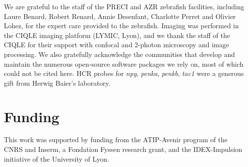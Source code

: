 \documentclass[9.5pt,lineno]{RandlettLab_elife}
\begin{document}
We are grateful to the staff of the PRECI and AZR zebrafish facilities, including Laure Benard, Robert Renard, Annie Desenfant, Charlotte Perret and Olivier Lohez, for the expert care provided to the zebrafish. 
Imaging was performed in the CIQLE imaging platform (LYMIC, Lyon), and we thank the staff of the CIQLE for their support with confocal and 2-photon microscopy and image processing.
We also gratefully acknowledge the communities that develop and maintain the numerous open-source software packages we rely on, most of which could not be cited here.
HCR probes for \emph{npy}, \emph{penka}, \emph{penkb}, \emph{tac1} were a generous gift from Herwig Baier's laboratory.


\section{Funding}
This work was supported by funding from the ATIP-Avenir program of the CNRS and Inserm, a Fondation Fyssen research grant, and the IDEX-Impulsion initiative of the University of Lyon.




\newpage
\end{document}
